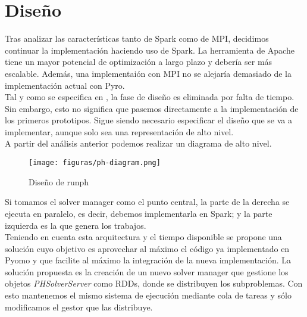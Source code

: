 \chapter{Diseño}
\label{ch:design}

Tras analizar las características tanto de Spark como de MPI, decidimos continuar la implementación haciendo uso de Spark. La herramienta de Apache tiene un mayor potencial de optimización a largo plazo y debería ser más escalable. Además, una implementaión con MPI no se alejaría demasiado de la implementación actual con Pyro.\\

Tal y como se especifica en \cite{sec:modificacionesCronograma}, la fase de diseño es eliminada por falta de tiempo. Sin embargo, esto no significa que pasemos directamente a la implementación de los primeros prototipos. Sigue siendo necesario especificar el diseño que se va a implementar, aunque solo sea una representación de alto nivel.\\

A partir del análisis anterior podemos realizar un diagrama de alto nivel.

\begin{figure}[H]
    \centerline{\texttt{[image: figuras/ph-diagram.png]}}
    \caption{Diseño de runph}
    \label{fig:ph-diagram}
\end{figure}

Si tomamos el solver manager como el punto central, la parte de la derecha se ejecuta en paralelo, es decir, debemos implementarla en Spark; y la parte izquierda es la que genera los trabajos.\\

Teniendo en cuenta esta arquitectura y el tiempo disponible se propone una solución cuyo objetivo es aprovechar al máximo el código ya implementado en Pyomo y que facilite al máximo la integración de la nueva implementación. La solución propuesta es la creación de un nuevo solver manager que gestione los objetos \textit{PHSolverServer} como RDDs, donde se distribuyen los subproblemas. Con esto mantenemos el mismo sistema de ejecución mediante cola de tareas y sólo modificamos el gestor que las distribuye. 